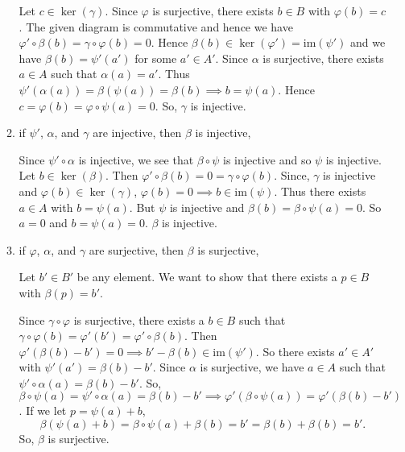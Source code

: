\documentclass[12pt]{article}
\newcommand{\al}{\alpha}
\newcommand{\im}{\text{im}}
\begin{document}
\begin{enumerate}
\begin{enumerate}
    \begin{mybox}
        Let $c\in\ker(\gamma)$. Since $\varphi$ is surjective,
        there exists $b\in B$ with $\varphi(b)=c$. The
        given diagram is commutative and hence we have
        $\varphi'\circ \beta(b)=\gamma\circ\varphi(b)=0$.
        Hence $\beta(b)\in\ker(\varphi')=\im(\psi')$ and we
        have $\beta(b)=\psi'(a')$ for some $a'\in A'$. Since
        $\alpha$ is surjective, there exists $a\in A$ such that
        $\alpha(a)=a'$. Thus $\psi'(\alpha(a))=\beta(\psi(a))
        =\beta(b) \implies b=\psi(a).$ Hence $c=\varphi(b)
        =\varphi\circ\psi(a)=0$. So, $\gamma$ is injective.
    \end{mybox}

    \item if $\psi'$, $\al$, and $\gamma$ are
    injective, then $\beta$ is injective,

    \begin{mybox}
        Since $\psi'\circ\alpha$
        is injective, we see that $\beta\circ\psi$ is
        injective and so $\psi$ is injective.
        Let $b\in\ker(\beta)$. Then $\varphi'\circ\beta
        (b)=0=\gamma\circ\varphi(b)$. Since, $\gamma$ is
        injective and $\varphi(b)\in\ker(\gamma)$,
        $\varphi(b)=0\implies b\in \im(\psi)$. Thus there
        exists $a\in A$ with $b=\psi(a)$. But $\psi$ is
        injective and $\beta(b)=\beta\circ\psi(a)=0$.
        So $a=0$ and $b=\psi(a)=0$. $\beta$ is injective.

    \end{mybox}
    
    \item if $\varphi$, $\al$, and $\gamma$ are
    surjective, then $\beta$ is surjective,

    \begin{mybox}
        Let $b'\in B'$ be any element. We want to show that
        there exists a $p\in B$ with $\beta(p)=b'$.

        \vspace*{2mm}
        Since $\gamma\circ\varphi$
        is surjective, there exists a $b\in B$ such that
        $\gamma\circ\varphi(b)=\varphi'(b')=\varphi'\circ
        \beta(b)$. Then $\varphi'(\beta(b)-b')=0\implies
        b'-\beta(b)\in \im(\psi')$. So there exists $a'\in A'$
        with $\psi'(a')=\beta(b)-b'$. Since $\alpha$ is
        surjective, we have $a\in A$ such that $\psi'\circ
        \alpha(a)=\beta(b)-b'$. So, $\beta\circ\psi(a)
        =\psi'\circ\alpha(a)=\beta(b)-b'\implies\varphi'(\beta
        \circ\psi(a))=\varphi'(\beta(b)-b')$. If we let
        $p=\psi(a)+b$, 
        $$\beta(\psi(a)+b)=\beta\circ\psi(a)+\beta(b)
        =b'=\beta(b)+\beta(b)=b'.$$
        So, $\beta$ is surjective.
    \end{mybox}


\end{enumerate}
\end{enumerate}
\end{document}
